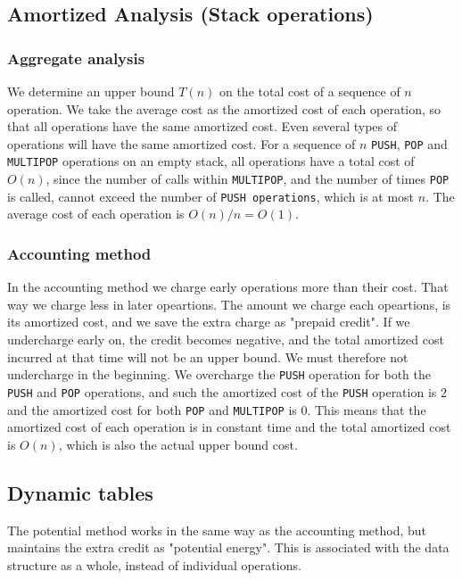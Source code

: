 \subsection*{Amortized Analysis (Stack operations)}
\subsubsection*{Aggregate analysis}
We determine an upper bound $T(n)$ on the total cost of a sequence of $n$
operation. We take the average cost as the amortized cost of each operation, so
that all operations have the same amortized cost. Even several types of
operations will have the same amortized cost.
\newline\newline
For a sequence of $n$ \texttt{PUSH}, \texttt{POP} and \texttt{MULTIPOP}
operations on an empty stack, all operations have a total cost of $O(n)$, since
the number of calls within \texttt{MULTIPOP}, and the number of times
\texttt{POP} is called, cannot exceed the number of \texttt{PUSH operations},
which is at most $n$. The average cost of each operation is $O(n)/n=O(1)$.

\subsubsection*{Accounting method}
In the accounting method we charge early operations more than their cost. That
way we charge less in later opeartions. The amount we charge each opeartions, is
its amortized cost, and we save the extra charge as "prepaid credit". If we
undercharge early on, the credit becomes negative, and the total amortized cost
incurred at that time will not be an upper bound. We must therefore not
undercharge in the beginning.
\newline\newline
We overcharge the \texttt{PUSH} operation for both the \texttt{PUSH} and
\texttt{POP} operations, and such the amortized cost of the \texttt{PUSH}
operation is $2$ and the amortized cost for both \texttt{POP} and
\texttt{MULTIPOP} is $0$. This means that the amortized cost of each operation
is in constant time and the total amortized cost is $O(n)$, which is also the
actual upper bound cost.

\subsection*{Dynamic tables}
The potential method works in the same way as the accounting method, but
maintains the extra credit as "potential energy". This is associated with the
data structure as a whole, instead of individual operations.
